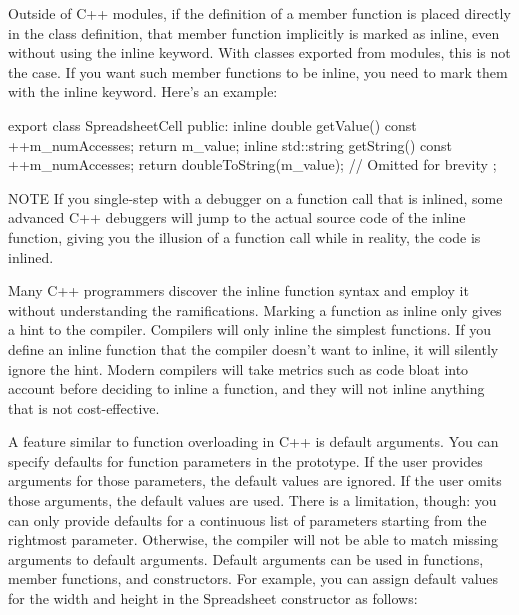Outside of C++ modules, if the definition of a member function is placed directly in the class definition, that member function implicitly is marked as inline, even without using the inline keyword. With classes exported from modules, this is not the case. If you want such member functions to be inline, you need to mark them with the inline keyword. Here’s an example:

\begin{cpp}
export class SpreadsheetCell
{
    public:
        inline double getValue() const { ++m_numAccesses; return m_value; }
        inline std::string getString() const
        {
            ++m_numAccesses;
            return doubleToString(m_value);
        }
        // Omitted for brevity
};
\end{cpp}

\begin{myNotic}{NOTE}
If you single-step with a debugger on a function call that is inlined, some advanced C++ debuggers will jump to the actual source code of the inline function, giving you the illusion of a function call while in reality, the code is inlined.
\end{myNotic}

Many C++ programmers discover the inline function syntax and employ it without understanding the ramifications. Marking a function as inline only gives a hint to the compiler. Compilers will only inline the simplest functions. If you define an inline function that the compiler doesn’t want to inline, it will silently ignore the hint. Modern compilers will take metrics such as code bloat into account before deciding to inline a function, and they will not inline anything that is not cost-effective.


A feature similar to function overloading in C++ is default arguments. You can specify defaults for function parameters in the prototype. If the user provides arguments for those parameters, the default values are ignored. If the user omits those arguments, the default values are used. There is a limitation, though: you can only provide defaults for a continuous list of parameters starting from the rightmost parameter. Otherwise, the compiler will not be able to match missing arguments to default arguments. Default arguments can be used in functions, member functions, and constructors. For example, you can assign default values for the width and height in the Spreadsheet constructor as follows:

